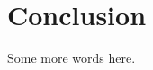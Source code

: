 \documentclass[../dissertation.tex]{\subfiles}
\begin{document}
\chapter{Conclusion}
Some more words here.
\end{document}
